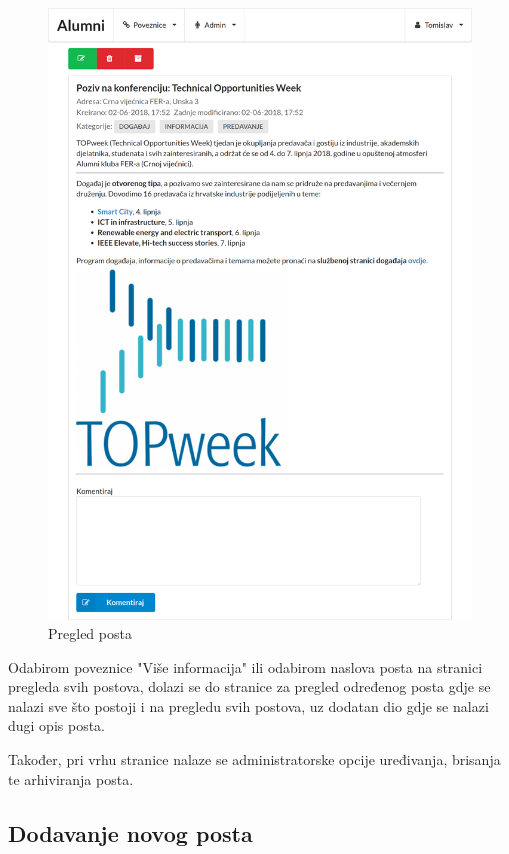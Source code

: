 \documentclass[zavrsni, numeric]{fer}
\begin{document}
\begin{figure}[H]
	\centering
	\includegraphics[width=13cm]{slike/post.png}
	\caption{Pregled posta}
	\label{fig:post}
\end{figure}

Odabirom poveznice "Više informacija" ili odabirom naslova posta na stranici pregleda svih postova, dolazi se do stranice za pregled određenog posta gdje se nalazi sve što postoji i na pregledu svih postova, uz dodatan dio gdje se nalazi dugi opis posta.

Također, pri vrhu stranice nalaze se administratorske opcije uređivanja, brisanja te arhiviranja posta.
 
\subsection{Dodavanje novog posta}
\end{document}
